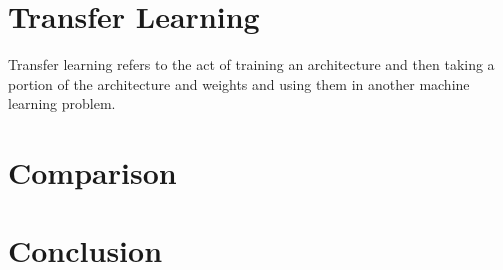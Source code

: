 \documentclass[hidelinks]{article}
\begin{document}

\section{Transfer Learning}
Transfer learning refers to the act of training an architecture and then taking a portion of the architecture and weights and using them in another machine learning problem.


\section{Comparison}


\section{Conclusion}
\end{document}

